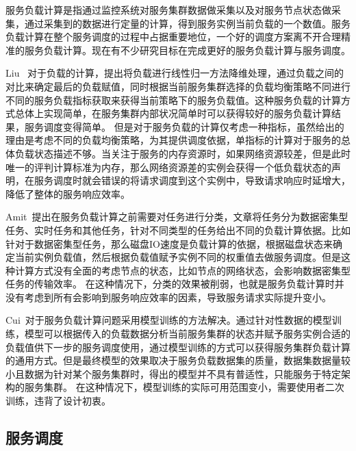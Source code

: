 服务负载计算是指通过监控系统对服务集群数据做采集以及对服务节点状态做采集，通过采集到的数据进行定量的计算，得到服务实例当前负载的一个数值。服务负载计算在整个服务调度的过程中占据重要地位，一个好的调度方案离不开合理精准的服务负载计算。现在有不少研究目标在完成更好的服务负载计算与服务调度。\par
Liu~\citep{9112373} 对于负载的计算，提出将负载进行线性归一方法降维处理，通过负载之间的对比来确定最后的负载赋值，同时根据当前服务集群选择的负载均衡策略不同进行不同的服务负载指标获取来获得当前策略下的服务负载值。这种服务负载的计算方式总体上实现简单，在服务集群内部状况简单时可以获得较好的服务负载计算结果，服务调度变得简单。
但是对于服务负载的计算仅考虑一种指标，虽然给出的理由是考虑不同的负载均衡策略，为其提供调度依据，单指标的计算对于服务的总体负载状态描述不够。当关注于服务的内存资源时，如果网络资源较差，但是此时唯一的评判计算标准为内存，那么网络资源差的实例会获得一个低负载状态的声明，在服务调度时就会错误的将请求调度到这个实例中，导致请求响应时延增大，降低了整体的服务响应效率。\par
Amit~\citep{9045136}提出在服务负载计算之前需要对任务进行分类，文章将任务分为数据密集型任务、实时任务和其他任务，针对不同类型的任务给出不同的负载计算依据。比如针对于数据密集型任务，那么磁盘IO速度是负载计算的依据，根据磁盘状态来确定当前实例负载值，然后根据负载值赋予实例不同的权重值去做服务调度。但是这种计算方式没有全面的考虑节点的状态，比如节点的网络状态，会影响数据密集型任务的传输效率。
在这种情况下，分类的效果被削弱，也就是服务负载计算时并没有考虑到所有会影响到服务响应效率的因素，导致服务请求实际提升变小。\par
Cui~\citep{9359175}对于服务负载计算问题采用模型训练的方法解决。通过针对性数据的模型训练，模型可以根据传入的负载数据分析当前服务集群的状态并赋予服务实例合适的负载值供下一步的服务调度使用，通过模型训练的方式可以获得服务集群负载计算的通用方式。但是最终模型的效果取决于服务负载数据集的质量，数据集数据量较小且数据为针对某个服务集群时，得出的模型并不具有普适性，只能服务于特定架构的服务集群。
在这种情况下，模型训练的实际可用范围变小，需要使用者二次训练，违背了设计初衷。\par

\subsection{服务调度}

